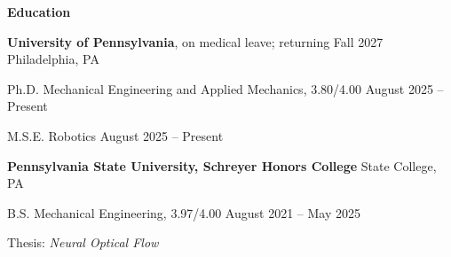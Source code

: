 \begin{center}
    \textbf{Education}
\end{center}
\textbf{University of Pennsylvania}, on medical leave; returning Fall 2027 \hfill Philadelphia, PA

Ph.D. Mechanical Engineering and Applied Mechanics, 3.80/4.00 \hfill August 2025 -- Present

M.S.E. Robotics \hfill August 2025 -- Present

\textbf{Pennsylvania State University, Schreyer Honors College} \hfill State College, PA

B.S. Mechanical Engineering, 3.97/4.00 \hfill August 2021 -- May 2025

Thesis: \textit{Neural Optical Flow}

